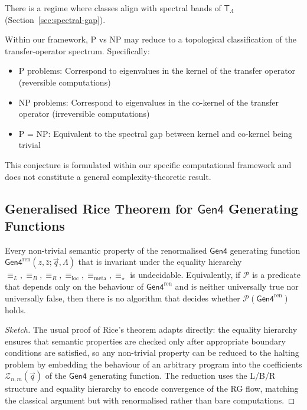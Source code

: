 \begin{conjecture}
There is a regime where classes align with spectral bands of $\mathsf{T}_\Lambda$ (Section~\ref{sec:spectral-gap}).
\end{conjecture}

\begin{conjecture}
\label{conj:p-vs-np-spectrum}
Within our framework, P vs NP may reduce to a topological classification of the transfer-operator spectrum. Specifically:
\begin{itemize}
\item P problems: Correspond to eigenvalues in the kernel of the transfer operator (reversible computations)
\item NP problems: Correspond to eigenvalues in the co-kernel of the transfer operator (irreversible computations)
\item P = NP: Equivalent to the spectral gap between kernel and co-kernel being trivial
\end{itemize}
This conjecture is formulated within our specific computational framework and does not constitute a general complexity-theoretic result.
\end{conjecture}

\subsection{Generalised Rice Theorem for $\mathsf{Gen4}$ Generating Functions}

\begin{theorem}
Every non-trivial semantic property of the renormalised $\mathsf{Gen4}$ generating function $\mathsf{Gen4}^{\text{ren}}(z,\bar z;\vec q,\Lambda)$ that is invariant under the equality hierarchy $\equiv_L, \equiv_B, \equiv_R, \equiv_{\text{loc}}, \equiv_{\text{meta}}, \equiv_\star$ is undecidable. Equivalently, if $\mathcal{P}$ is a predicate that depends only on the behaviour of $\mathsf{Gen4}^{\text{ren}}$ and is neither universally true nor universally false, then there is no algorithm that decides whether $\mathcal{P}(\mathsf{Gen4}^{\text{ren}})$ holds.
\end{theorem}

\begin{proof}[Sketch]
The usual proof of Rice's theorem adapts directly: the equality hierarchy ensures that semantic properties are checked only after appropriate boundary conditions are satisfied, so any non-trivial property can be reduced to the halting problem by embedding the behaviour of an arbitrary program into the coefficients $\mathcal{Z}_{n,m}(\vec q)$ of the $\mathsf{Gen4}$ generating function. The reduction uses the L/B/R structure and equality hierarchy to encode convergence of the RG flow, matching the classical argument but with renormalised rather than bare computations.
\end{proof}

